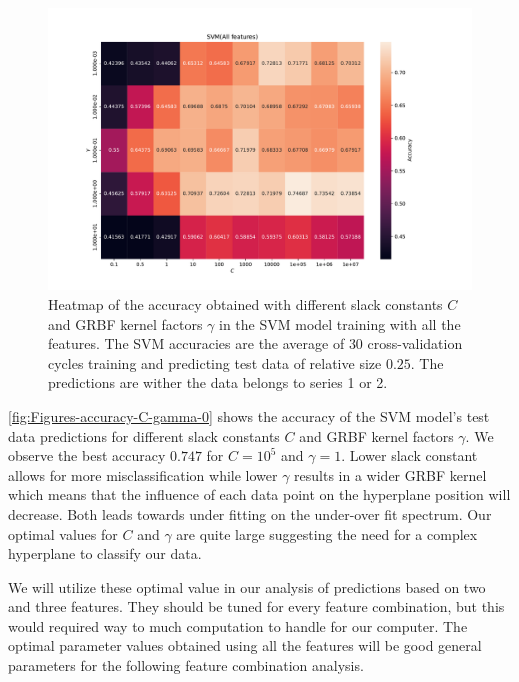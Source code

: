 \begin{figure}[H]
\centering
\includegraphics[width=1\textwidth]{Figures/accuracy(C,gamma)0}
\caption{Heatmap of the accuracy obtained with different slack constants $C$ and 
GRBF kernel factors $\gamma $ in the SVM model training with all the features. The SVM accuracies are the average of $30$ cross-validation 
cycles training and predicting test data of relative size $0.25$.
The predictions are wither the data belongs to series 1 or 2.}
\label{fig:Figures-accuracy-C-gamma-0}
\end{figure}
\autoref{fig:Figures-accuracy-C-gamma-0} shows the accuracy of the SVM model's 
test data predictions for different slack constants $C$ and GRBF kernel factors $\gamma $. 
We observe the best accuracy $0.747$ for $C=10^5$ and $\gamma =1$. Lower slack constant 
allows for more misclassification while lower $\gamma $ results in a wider 
GRBF kernel which means that the influence of each data point on the hyperplane 
position will decrease. Both leads towards under fitting on the under-over fit spectrum.
Our optimal values for $C$ and $\gamma $ are quite large suggesting the need for 
a complex hyperplane to classify our data. 

We will utilize these optimal value in our analysis of predictions based on two and three 
features. They should be tuned for every feature combination, but this would required 
way to much computation to handle for our computer. The optimal parameter values 
obtained using all the features will be good general parameters for the following 
feature combination analysis. 

